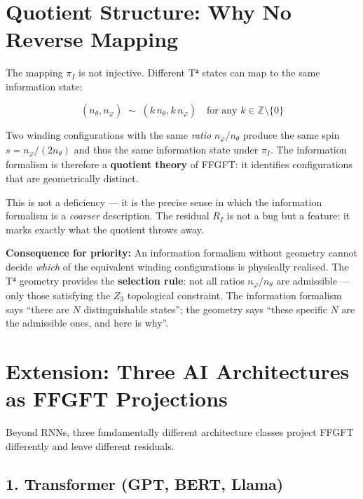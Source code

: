 \section{Quotient Structure: Why No Reverse Mapping}

The mapping $\pi_I$ is not injective. Different T⁴ states can map to
the same information state:

\begin{equation}
  (n_\theta, n_\varphi) \;\sim\; (k\,n_\theta, k\,n_\varphi)
  \quad\text{for any } k \in \mathbb{Z}\setminus\{0\}
  \tag{243.10}
\end{equation}

Two winding configurations with the same \emph{ratio}
$n_\varphi/n_\theta$ produce the same spin $s = n_\varphi/(2n_\theta)$
and thus the same information state under $\pi_I$.
The information formalism is therefore a \textbf{quotient theory}
of FFGFT: it identifies configurations that are geometrically distinct.

This is not a deficiency --- it is the precise sense in which the
information formalism is a \emph{coarser} description. The residual
$R_I$ is not a bug but a feature: it marks exactly what the quotient
throws away.

\textbf{Consequence for priority:} An information formalism without
geometry cannot decide \emph{which} of the equivalent winding
configurations is physically realised. The T⁴ geometry provides the
\textbf{selection rule}: not all ratios $n_\varphi/n_\theta$ are
admissible --- only those satisfying the $Z_3$ topological constraint.
The information formalism says ``there are $N$ distinguishable states'';
the geometry says ``these specific $N$ are the admissible ones, and
here is why''.


\section{Extension: Three AI Architectures as FFGFT Projections}

Beyond RNNs, three fundamentally different architecture classes project
FFGFT differently and leave different residuals.

\subsection*{1. Transformer (GPT, BERT, Llama)}

